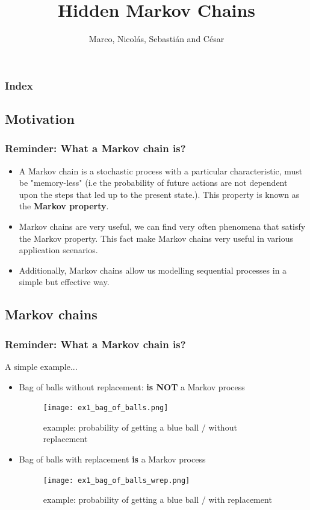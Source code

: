 \documentclass[xcolor=dvipsnames, compress]{beamer}
\title[Hidden Markov Chains]{Hidden Markov Chains}
\author{Marco, Nicolás, Sebastián and César}
\institute[ITAM]
\begin{document}
%
\begin{frame}
\titlepage
\end{frame}

\begin{frame}
\frametitle{Index}
 \tableofcontents%
\end{frame}

\begin{frame}
\section{Motivation }
\frametitle{Reminder: What a Markov chain is?}
\begin{itemize}	
	\item A Markov chain is a stochastic process with a particular characteristic, must be "memory-less" (i.e the probability of future actions are not dependent upon the steps that led up to the present state.). This property is known as the \textbf{Markov property}.
	\item Markov chains are very useful, we can find very often phenomena that satisfy the Markov property. This fact make Markov chains very useful in various application scenarios.
	\item Additionally, Markov chains allow us modelling sequential processes in a simple but effective way.	
\end{itemize}
\end{frame}

\begin{frame}
\section{Markov chains }
\frametitle{Reminder: What a Markov chain is?}
A simple example...
\begin{itemize}
	\item Bag of balls without replacement: \textbf{is NOT} a Markov process
	\begin{figure}
		\texttt{[image: ex1\_bag\_of\_balls.png]}
		\caption{example: probability of getting a blue ball / without replacement}
	\end{figure}
	\item Bag of balls with replacement \textbf{is} a Markov process
	\begin{figure}
		\texttt{[image: ex1\_bag\_of\_balls\_wrep.png]}
		\caption{example: probability of getting a blue ball / with replacement}
	\end{figure}
\end{itemize}
\end{frame}
\end{document}
